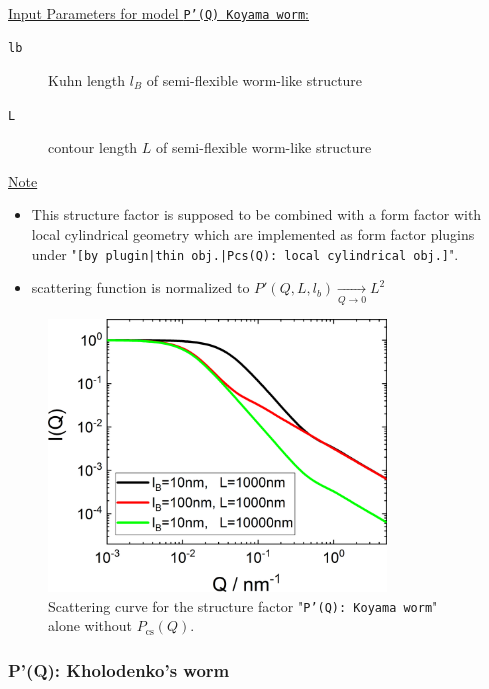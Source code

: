 \vspace{5mm}

\hspace{1pt}\\
\uline{Input Parameters for model \texttt{P'(Q) Koyama worm}:}\\
\begin{description}
\item[\texttt{lb}] Kuhn length $l_B$ of semi-flexible worm-like structure
\item[\texttt{L}] contour length $L$ of semi-flexible worm-like structure
\end{description}

\noindent
\uline{Note}
\begin{itemize}
  \item This structure factor is supposed to be combined with a form factor with local cylindrical geometry which are implemented as form factor plugins
under "\texttt{[by plugin|thin obj.|Pcs(Q): local cylindrical obj.]}".
  \item scattering function is normalized to $P'(Q,L,l_b) \xrightarrow[Q\rightarrow 0]{} L^2$
\end{itemize}

\begin{figure}[htb]
\begin{center}
\includegraphics[width=0.8\textwidth]{../images/form_factor/polymer_semiflexible/PprimeKoyamaWorm.png}
\end{center}
\caption{Scattering curve for the structure factor "\texttt{P'(Q): Koyama worm}" alone without $P_\mathrm{cs}(Q)$.}
\label{fig_IQ:PprimeKoyamaWorm}
\end{figure}

\clearpage
\subsubsection{P'(Q): Kholodenko's worm} ~\\
\label{plugin:Pprime4kohlodenko}

